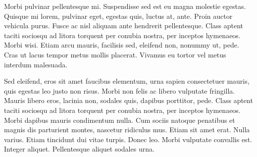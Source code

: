 Morbi pulvinar pellentesque mi. Suspendisse sed est eu magna molestie egestas. Quisque mi lorem, pulvinar
eget, egestas quis, luctus at, ante. Proin auctor vehicula purus. Fusce ac nisl aliquam
ante hendrerit pellentesque. Class aptent taciti sociosqu ad litora torquent per conubia
nostra, per inceptos hymenaeos. Morbi wisi. Etiam arcu mauris, facilisis sed, eleifend non,
nonummy ut, pede. Cras ut lacus tempor metus mollis placerat. Vivamus eu tortor vel
metus interdum malesuada.

Sed eleifend, eros sit amet faucibus elementum, urna sapien consectetuer mauris, quis egestas
leo justo non risus. Morbi non felis ac libero vulputate fringilla. Mauris libero eros, lacinia
non, sodales quis, dapibus porttitor, pede. Class aptent taciti sociosqu ad litora torquent per
conubia nostra, per inceptos hymenaeos. Morbi dapibus mauris condimentum nulla. Cum
sociis natoque penatibus et magnis dis parturient montes, nascetur ridiculus mus. Etiam
sit amet erat. Nulla varius. Etiam tincidunt dui vitae turpis. Donec leo. Morbi vulputate
convallis est. Integer aliquet. Pellentesque aliquet sodales urna.